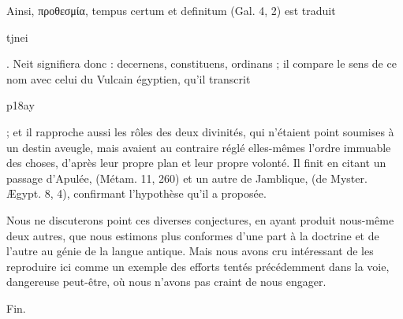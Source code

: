 \documentclass[letterpaper,twocolumn,openany,nodeprecatedcode]{dndbook}
\begin{document}
Ainsi, προθεσμία, tempus certum et definitum (Gal. 4, 2) est traduit \begin{coptic}tjnei\end{coptic}. Neit signifiera donc : decernens, constituens, ordinans ; il compare le sens de ce nom avec celui du Vulcain égyptien, qu'il transcrit \begin{coptic}p18ay\end{coptic} ; et il rapproche aussi les rôles des deux divinités, qui n'étaient point soumises à un destin aveugle, mais avaient au contraire réglé elles-mêmes l'ordre immuable des choses, d'après leur propre plan et leur propre volonté. Il finit en citant un passage d'Apulée, (Métam. 11, 260) et un autre de Jamblique, (de Myster. Ægypt. 8, 4), confirmant l'hypothèse qu'il a proposée.

Nous ne discuterons point ces diverses conjectures, en ayant produit nous-même deux autres, que nous estimons plus conformes d'une part à la doctrine et de l'autre au génie de la langue antique. Mais nous avons cru intéressant de les reproduire ici comme un exemple des efforts tentés précédemment dans la voie, dangereuse peut-être, où nous n'avons pas craint de nous engager.

Fin.
\end{document}
